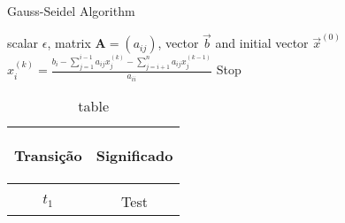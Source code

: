 \begin{algorithm2e}
\caption{Gauss-Seidel Algorithm}\label{alg:gauss-seidel}
\KwIn
{%
scalar $\epsilon$,
matrix $\mathbf{A} = (a_{ij})$,
vector $\vec{b}$
and initial vector $\vec{x}^{(0)}$
}
{
{
$
x_i^{(k)} =
\frac
{
b_i-\sum_{j=1}^{i-1}a_{ij}x_j^{(k)}
-\sum_{j=i+1}^{n}a_{ij}x_j^{(k-1)}
}%
{a_{ii}}
$\;
}
{Stop}
}
\end{algorithm2e}

\begin{table}[H]
  \centering
  \begin{tabular}{cc}
    \label{tab:tab1}
    \hypertarget{tab:1}{}
    Transição&Significado\\
    \hline \\
    \hyperlink{net:1}{$t_{1}$}&Test

  \end{tabular}
  \caption{table}
\end{table}
\OmegaSet

